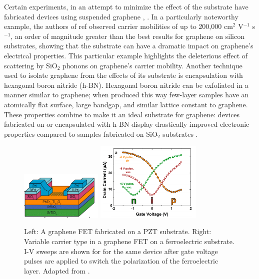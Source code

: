 \documentclass[edeposit,fullpage,draftthesis]{uiucthesis2009}
\begin{document}
        Certain experiments, in an attempt to minimize the effect of the substrate have fabricated 
        devices using suspended graphene \cite{bolotin2008ultrahigh}, \cite{Du2008}. In a particularly noteworthy 
        example, the authors of ref \cite{bolotin2008ultrahigh} observed carrier mobilities of up 
        to 200,000 cm$^2$ V$^{-1}$ s$^{-1}$, an order of magnitude greater than the best results for 
        graphene on silicon substrates, showing that the substrate can have a dramatic impact on 
        graphene's electrical properties. This particular example highlights the deleterious effect
        of scattering by SiO$_2$ phonons on graphene's carrier mobility.
        Another technique used to isolate graphene from the effects of its substrate is encapsulation
        with hexagonal boron nitride (h-BN). 
        Hexagonal boron nitride can be exfoliated in a manner similar to graphene; when produced this 
        way few-layer samples have an atomically flat surface, large 
        bandgap, and similar lattice constant to graphene. These properties combine to make it
        an ideal substrate for graphene:
        devices fabricated on or encapsulated with h-BN display drastically improved electronic 
        properties compared to samples fabricated on SiO$_2$ substrates \cite{Dean2010, Xue2011}.
     
            \begin{figure}
            \centering
            \includegraphics[width=0.35\textwidth]{images/background/ChristophDevice.png}
            \includegraphics[width=0.45\textwidth]{images/background/ChristophFig4.png}
            \caption[Graphene on ferroelectric substrates]{Left: A graphene FET fabricated on a PZT substrate. Right: Variable carrier type in a graphene FET on a ferroelectric substrate. I-V sweeps are shown for for the same device after gate voltage pulses are applied to switch the polarization of the ferroelectric layer. Adapted from \cite{Baeumer2013}.}
            \label{fig:GonPZT}
            \end{figure}
        
\end{document}
